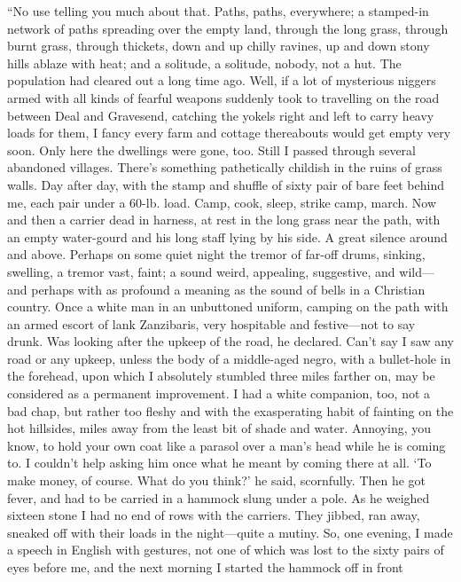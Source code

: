 \documentclass[12pt]{report}
\begin{document}
``No use telling you much about that. Paths, paths, everywhere; a
stamped-in network of paths spreading over the empty land, through the
long grass, through burnt grass, through thickets, down and up chilly
ravines, up and down stony hills ablaze with heat; and a solitude, a
solitude, nobody, not a hut. The population had cleared out a long time
ago. Well, if a lot of mysterious niggers armed with all kinds of
fearful weapons suddenly took to travelling on the road between Deal and
Gravesend, catching the yokels right and left to carry heavy loads for
them, I fancy every farm and cottage thereabouts would get empty very
soon. Only here the dwellings were gone, too. Still I passed through
several abandoned villages. There's something pathetically childish in
the ruins of grass walls. Day after day, with the stamp and shuffle of
sixty pair of bare feet behind me, each pair under a 60-lb. load. Camp,
cook, sleep, strike camp, march. Now and then a carrier dead in harness,
at rest in the long grass near the path, with an empty water-gourd and
his long staff lying by his side. A great silence around and above.
Perhaps on some quiet night the tremor of far-off drums, sinking,
swelling, a tremor vast, faint; a sound weird, appealing, suggestive,
and wild---and perhaps with as profound a meaning as the sound of bells
in a Christian country. Once a white man in an unbuttoned uniform,
camping on the path with an armed escort of lank Zanzibaris, very
hospitable and festive---not to say drunk. Was looking after the upkeep
of the road, he declared. Can't say I saw any road or any upkeep, unless
the body of a middle-aged negro, with a bullet-hole in the forehead,
upon which I absolutely stumbled three miles farther on, may be
considered as a permanent improvement. I had a white companion, too, not
a bad chap, but rather too fleshy and with the exasperating habit of
fainting on the hot hillsides, miles away from the least bit of shade
and water. Annoying, you know, to hold your own coat like a parasol over
a man's head while he is coming to. I couldn't help asking him once what
he meant by coming there at all. `To make money, of course. What do you
think?' he said, scornfully. Then he got fever, and had to be carried in
a hammock slung under a pole. As he weighed sixteen stone I had no end
of rows with the carriers. They jibbed, ran away, sneaked off with their
loads in the night---quite a mutiny. So, one evening, I made a speech in
English with gestures, not one of which was lost to the sixty pairs of
eyes before me, and the next morning I started the hammock off in front
\end{document}
